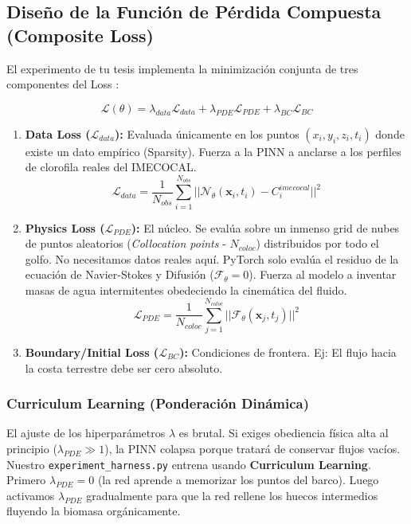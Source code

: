 \documentclass[11pt,a4paper]{article}
\begin{document}
\subsection{Diseño de la Función de Pérdida Compuesta (Composite Loss)}
El experimento de tu tesis implementa la minimización conjunta de tres componentes del Loss \cite{li2024}:

\begin{tcolorbox}[colback=red!5!white,colframe=red!75!black,title=La Función de Pérdida Global PINN]
\[ \mathcal{L}(\theta) = \lambda_{data} \mathcal{L}_{data} + \lambda_{PDE} \mathcal{L}_{PDE} + \lambda_{BC} \mathcal{L}_{BC} \]
\end{tcolorbox}

\begin{enumerate}
    \item \textbf{Data Loss ($\mathcal{L}_{data}$):} Evaluada únicamente en los puntos $(x_i, y_i, z_i, t_i)$ donde existe un dato empírico (Sparsity). Fuerza a la PINN a anclarse a los perfiles de clorofila reales del IMECOCAL. 
    \[ \mathcal{L}_{data} = \frac{1}{N_{obs}} \sum_{i=1}^{N_{obs}} || \mathcal{N}_\theta(\mathbf{x}_i, t_i) - C^{imecocal}_i ||^2 \]
    
    \item \textbf{Physics Loss ($\mathcal{L}_{PDE}$):} El núcleo. Se evalúa sobre un inmenso grid de nubes de puntos aleatorios (\textit{Collocation points} - $N_{coloc}$) distribuidos por todo el golfo. No necesitamos datos reales aquí. PyTorch solo evalúa el residuo de la ecuación de Navier-Stokes y Difusión ($\mathcal{F}_\theta = 0$). Fuerza al modelo a inventar masas de agua intermitentes obedeciendo la cinemática del fluido.
    \[ \mathcal{L}_{PDE} = \frac{1}{N_{coloc}} \sum_{j=1}^{N_{coloc}} || \mathcal{F}_\theta(\mathbf{x}_j, t_j) ||^2 \]

    \item \textbf{Boundary/Initial Loss ($\mathcal{L}_{BC}$):} Condiciones de frontera. Ej: El flujo hacia la costa terrestre debe ser cero absoluto.
\end{enumerate}

\subsubsection{Curriculum Learning (Ponderación Dinámica)}
El ajuste de los hiperparámetros $\lambda$ es brutal. Si exiges obediencia física alta al principio ($\lambda_{PDE} \gg 1$), la PINN colapsa porque tratará de conservar flujos vacíos. Nuestro \texttt{experiment\_harness.py} entrena usando \textbf{Curriculum Learning}. Primero $\lambda_{PDE} = 0$ (la red aprende a memorizar los puntos del barco). Luego activamos $\lambda_{PDE}$ gradualmente para que la red rellene los huecos intermedios fluyendo la biomasa orgánicamente.
\end{document}
